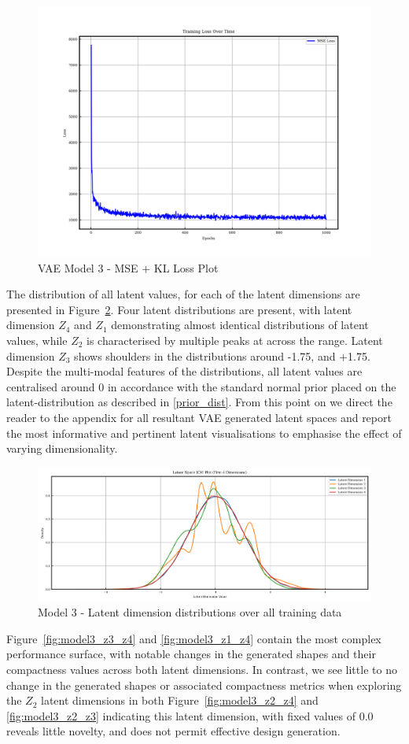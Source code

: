\documentclass{article}
\begin{document}
\begin{figure}[H]
\centering
    \includegraphics[width=0.75\linewidth]{figures/VAEmodels/model3/loss_plot.png}
    \caption{VAE Model 3 - MSE + KL Loss Plot}
    \label{fig:model3_loss_plot}
\end{figure}

The distribution of all latent values, for each of the latent dimensions are presented in Figure~\ref{fig:model3_latent_dist}. Four latent distributions are present, with latent dimension $Z_4$ and $Z_1$ demonstrating almost identical distributions of latent values, while $Z_2$ is characterised by multiple peaks at across the range. Latent dimension $Z_3$ shows shoulders in the distributions around -1.75, and +1.75. Despite the multi-modal features of the distributions, all latent values are centralised around 0 in accordance with the standard normal prior placed on the latent-distribution as described in \ref{prior_dist}. From this point on we direct the reader to the appendix for all resultant VAE generated latent spaces and report the most informative and pertinent latent visualisations to emphasise the effect of varying dimensionality. 

\begin{figure}[H]
    \centering
    \includegraphics[width=0.75\linewidth]{figures/VAEmodels/model3/latent_distribution.png}
    \caption{Model 3 - Latent dimension distributions over all training data}
    \label{fig:model3_latent_dist}
\end{figure}
Figure~\ref{fig:model3_z3_z4} and \ref{fig:model3_z1_z4} contain the most complex performance surface, with notable changes in the generated shapes and their compactness values across both latent dimensions. In contrast, we see little to no change in the generated shapes or associated compactness metrics when exploring the $Z_2$ latent dimensions in both Figure~\ref{fig:model3_z2_z4} and \ref{fig:model3_z2_z3} indicating this latent dimension, with fixed values of 0.0 reveals little novelty, and does not permit effective design generation. 
\end{document}
